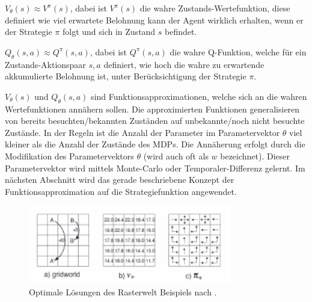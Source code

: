 \documentclass[conference]{IEEEtran}
\begin{document}
$V_{\theta}(s) \approx V^{\pi}(s)$, dabei ist $V^{\pi}(s)$ die wahre Zustands-Wertefunktion, diese definiert wie viel erwartete Belohnung kann der Agent wirklich erhalten, wenn er der Strategie $\pi$ folgt und sich in Zustand $s$ befindet.

$Q_{\theta}(s, a) \approx Q^{\pi}(s, a)$, dabei ist $Q^{\pi}(s, a)$ die wahre Q-Funktion, welche für ein Zustands-Aktionspaar $s, a$ definiert, wie hoch die wahre zu erwartende akkumulierte Belohnung ist, unter Berücksichtigung der Strategie $\pi$.

$V_{\theta}(s)$ und $Q_{\theta}(s, a)$ sind Funktionsapproximationen, welche sich an die wahren Wertefunktionen annähern sollen. Die approximierten Funktionen generalisieren von bereits besuchten/bekannten Zuständen auf unbekannte/noch nicht besuchte Zustände. In der Regeln ist die Anzahl der Parameter im Parametervektor $\theta$ viel kleiner als die Anzahl der Zustände des MDPs. Die Annäherung erfolgt durch die Modifikation des Parametervektors $\theta$ (wird auch oft als $w$ bezeichnet). Dieser Parametervektor wird mittels Monte-Carlo oder Temporaler-Differenz gelernt. Im nächsten Abschnitt wird das gerade beschriebene Konzept der Funktionsapproximation auf die Strategiefunktion angewendet.

\begin{figure}[!t]
\centering
\includegraphics[width=3.5in]{gridworld_example}
\caption{Optimale Lösungen des Rasterwelt Beispiels nach \cite{sutton_barto_12}.}
\label{gridworld_example}
\end{figure}
\end{document}
